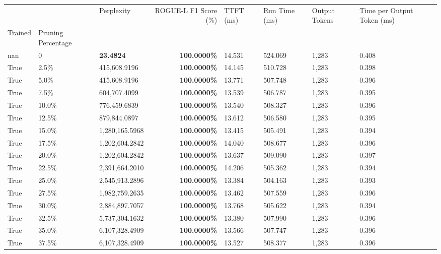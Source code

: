 \begin{table}[H]
\begin{tabular}{lllrllll}
\toprule
 &  & Perplexity & ROGUE-L F1 Score (\%) & TTFT (ms) & Run Time (ms) & Output Tokens & Time per Output Token (ms) \\
Trained & Pruning Percentage &  &  &  &  &  &  \\
\midrule
nan & 0 & \bfseries 23.4824 & \bfseries 100.0000\% & 14.531 & 524.069 & 1,283 & 0.408 \\
\cline{1-8}
True & 2.5\% & 415,608.9196 & \bfseries \color{red} 100.0000\% & 14.145 & 510.728 & 1,283 & 0.398 \\
\cline{1-8}
True & 5.0\% & 415,608.9196 & \bfseries \color{red} 100.0000\% & 13.771 & 507.748 & 1,283 & 0.396 \\
\cline{1-8}
True & 7.5\% & 604,707.4099 & \bfseries \color{red} 100.0000\% & 13.539 & 506.787 & 1,283 & 0.395 \\
\cline{1-8}
True & 10.0\% & 776,459.6839 & \bfseries \color{red} 100.0000\% & 13.540 & 508.327 & 1,283 & 0.396 \\
\cline{1-8}
True & 12.5\% & 879,844.0897 & \bfseries \color{red} 100.0000\% & 13.612 & 506.580 & 1,283 & 0.395 \\
\cline{1-8}
True & 15.0\% & 1,280,165.5968 & \bfseries \color{red} 100.0000\% & 13.415 & 505.491 & 1,283 & 0.394 \\
\cline{1-8}
True & 17.5\% & 1,202,604.2842 & \bfseries \color{red} 100.0000\% & 14.040 & 508.677 & 1,283 & 0.396 \\
\cline{1-8}
True & 20.0\% & 1,202,604.2842 & \bfseries \color{red} 100.0000\% & 13.637 & 509.090 & 1,283 & 0.397 \\
\cline{1-8}
True & 22.5\% & 2,391,664.2010 & \bfseries \color{red} 100.0000\% & 14.206 & 505.362 & 1,283 & 0.394 \\
\cline{1-8}
True & 25.0\% & 2,545,913.2896 & \bfseries \color{red} 100.0000\% & 13.384 & 504.163 & 1,283 & 0.393 \\
\cline{1-8}
True & 27.5\% & 1,982,759.2635 & \bfseries \color{red} 100.0000\% & 13.462 & 507.559 & 1,283 & 0.396 \\
\cline{1-8}
True & 30.0\% & 2,884,897.7057 & \bfseries \color{red} 100.0000\% & 13.768 & 505.622 & 1,283 & 0.394 \\
\cline{1-8}
True & 32.5\% & 5,737,304.1632 & \bfseries \color{red} 100.0000\% & 13.380 & 507.990 & 1,283 & 0.396 \\
\cline{1-8}
True & 35.0\% & 6,107,328.4909 & \bfseries \color{red} 100.0000\% & 13.566 & 507.747 & 1,283 & 0.396 \\
\cline{1-8}
True & 37.5\% & 6,107,328.4909 & \bfseries \color{red} 100.0000\% & 13.527 & 508.377 & 1,283 & 0.396 \\

\end{tabular}
\end{table}

